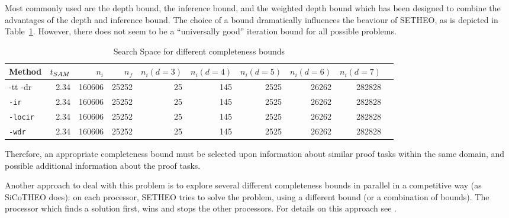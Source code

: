 Most commonly used are the depth bound, the inference bound, and the
weighted depth bound which has been designed to combine the advantages
of the depth and inference bound. The choice of a bound dramatically
influences the beaviour of SETHEO, as is depicted in
Table~\ref{tab:tut2:bounds.results}. However, there does not seem
to be a ``universally good'' iteration bound for all possible problems.

\begin{table}[htb]
\begin{center}
\begin{tabular}{|l|r|r||r|r||r|r|r|r|r|}
\hline
Method & $t_{SAM}$ & $n_i$ & $n_f$ & 
	$n_i (d=3)$ & $n_i (d=4)$ & $n_i (d=5)$ & $n_i (d=6)$ & $n_i (d=7)$ \\
\hline\hline
{-tt -dr} & 2.34 & 160606 & 25252 &
	25 & 145 & 2525 & 26262 & 282828 \\
\hline
{\tt -ir} & 2.34 & 160606 & 25252 &
	25 & 145 & 2525 & 26262 & 282828 \\
\hline
{\tt -locir} & 2.34 & 160606 & 25252 &
	25 & 145 & 2525 & 26262 & 282828 \\
\hline
{\tt -wdr} & 2.34 & 160606 & 25252 &
	25 & 145 & 2525 & 26262 & 282828 \\
\hline\hline
\end{tabular}
\end{center}
\caption{Search Space for different completeness bounds}
\label{tab:tut2:bounds.results}
\end{table}

Therefore, an appropriate completeness bound must be selected upon information
about similar proof tasks within the same domain, and possible additional
information about the proof tasks.

Another approach to deal with this problem is to explore several different
completeness bounds in parallel in a competitive way (as SiCoTHEO does):
on each processor, SETHEO tries to solve the problem, using a different
bound (or a combination of bounds). The processor which finds a solution
first, wins and stops the other processors.
For details on this approach see \cite{Sch96ppai}.


